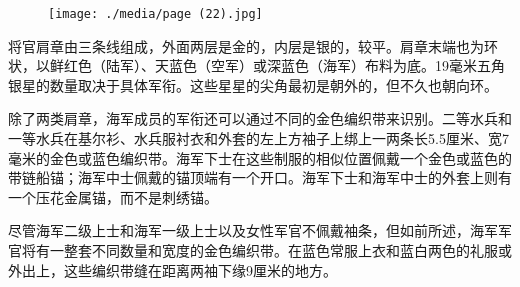 \begin{figure}
\texttt{[image: ./media/page (22).jpg]}
\end{figure}

将官肩章由三条线组成，外面两层是金的，内层是银的，较平。肩章末端也为环状，以鲜红色（陆军）、天蓝色（空军）或深蓝色（海军）布料为底。19毫米五角银星的数量取决于具体军衔。这些星星的尖角最初是朝外的，但不久也朝向环。

除了两类肩章，海军成员的军衔还可以通过不同的金色编织带来识别。二等水兵和一等水兵在基尔衫、水兵服衬衣和外套的左上方袖子上绑上一两条长5.5厘米、宽7毫米的金色或蓝色编织带。海军下士在这些制服的相似位置佩戴一个金色或蓝色的带链船锚；海军中士佩戴的锚顶端有一个开口。海军下士和海军中士的外套上则有一个压花金属锚，而不是刺绣锚。

尽管海军二级上士和海军一级上士以及女性军官不佩戴袖条，但如前所述，海军军官将有一整套不同数量和宽度的金色编织带。在蓝色常服上衣和蓝白两色的礼服或外出上，这些编织带缝在距离两袖下缘9厘米的地方。

